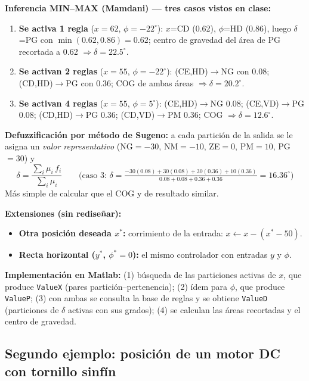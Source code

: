 \documentclass[11pt,a4paper]{article}
\newcommand{\grados}{^{\circ}}
\begin{document}
\textbf{Inferencia MIN--MAX (Mamdani) — tres casos vistos en clase:}
\begin{enumerate}[itemsep=1pt]
\item \textbf{Se activa 1 regla} ($x=62$, $\phi=-22\grados$): $x$=CD (0.62), $\phi$=HD (0.86), luego $\delta$=PG con $\min(0.62,0.86)=0.62$; centro de gravedad del área de PG recortada a 0.62 $\Rightarrow \delta=22.5\grados$.
\item \textbf{Se activan 2 reglas} ($x=55$, $\phi=-22\grados$): (CE,HD)$\to$NG con 0.08; (CD,HD)$\to$PG con 0.36; COG de ambas áreas $\Rightarrow \delta=20.2\grados$.
\item \textbf{Se activan 4 reglas} ($x=55$, $\phi=5\grados$): (CE,HD)$\to$NG 0.08; (CE,VD)$\to$PG 0.08; (CD,HD)$\to$PG 0.36; (CD,VD)$\to$PM 0.36; COG $\Rightarrow \delta=12.6\grados$.
\end{enumerate}

\textbf{Defuzzificación por método de Sugeno:} a cada partición de la salida se le asigna un \emph{valor representativo} (NG$=-30$, NM$=-10$, ZE$=0$, PM$=10$, PG$=30$) y
\[
\delta=\frac{\sum_i \mu_i\, f_i}{\sum_i \mu_i}
\qquad\text{(caso 3: }\delta=\tfrac{-30(0.08)+30(0.08)+30(0.36)+10(0.36)}{0.08+0.08+0.36+0.36}=16.36\grados\text{)}
\]
Más simple de calcular que el COG y de resultado similar.

\textbf{Extensiones (sin rediseñar):}
\begin{itemize}[itemsep=1pt]
\item \textbf{Otra posición deseada $x^{*}$:} corrimiento de la entrada: $x\leftarrow x-(x^{*}-50)$.
\item \textbf{Recta horizontal ($y^{*}$, $\phi^{*}=0$):} el mismo controlador con entradas $y$ y $\phi$.
\end{itemize}

\textbf{Implementación en Matlab:} (1) búsqueda de las particiones activas de $x$, que produce \texttt{ValueX} (pares partición--pertenencia); (2) ídem para $\phi$, que produce \texttt{ValueP}; (3) con ambas se consulta la base de reglas y se obtiene \texttt{ValueD} (particiones de $\delta$ activas con sus grados); (4) se calculan las áreas recortadas y el centro de gravedad.

\subsection{Segundo ejemplo: posición de un motor DC con tornillo sinfín}
\end{document}
